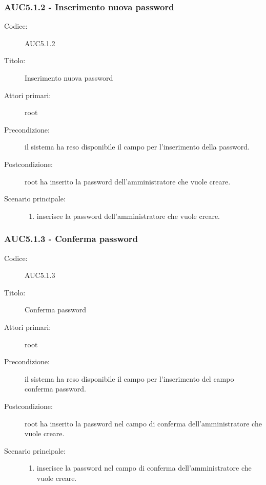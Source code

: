 \documentclass[casi-duso]{subfiles}
\begin{document}
\subsubsection{AUC5.1.2 - Inserimento nuova password}%
\label{subsub:AUC5.1.2}
\begin{description}
  \item[Codice:] AUC5.1.2
  \item[Titolo:] Inserimento nuova password
  \item[Attori primari:] root
  \item[Precondizione:] il sistema ha reso disponibile il campo per l'inserimento della password.
  \item[Postcondizione:] root ha inserito la password dell'amministratore che vuole creare.
  \item[Scenario principale:]
  \begin{enumerate}
    \item {} inserisce la password dell'amministratore che vuole creare.
  \end{enumerate}
\end{description}

\subsubsection{AUC5.1.3 - Conferma password}%
\label{subsub:AUC5.1.3}
\begin{description}
  \item[Codice:] AUC5.1.3
  \item[Titolo:] Conferma password
  \item[Attori primari:] root
  \item[Precondizione:] il sistema ha reso disponibile il campo per l'inserimento del campo conferma password.
  \item[Postcondizione:] root ha inserito la password nel campo di conferma dell'amministratore che vuole creare.
  \item[Scenario principale:]
  \begin{enumerate}
    \item {} inserisce la password nel campo di conferma dell'amministratore che vuole creare.
  \end{enumerate}
\end{description}
\end{document}
